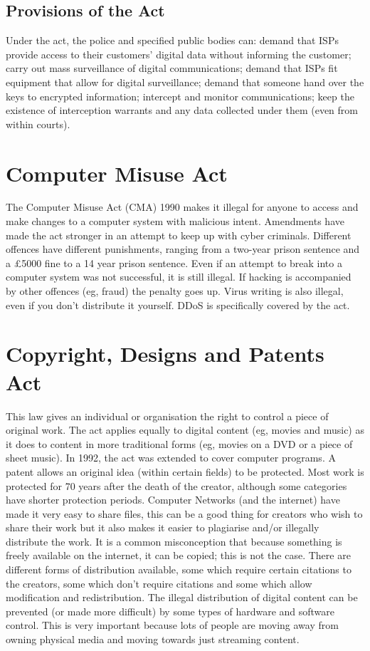 \documentclass[a4paper,11pt, twocolumn]{article}
\begin{document}
\subsection{Provisions of the Act}
Under the act, the police and specified public bodies can: demand that ISPs provide access to their customers' digital data without informing the customer; carry out mass surveillance of digital communications; demand that ISPs fit equipment that allow for digital surveillance; demand that someone hand over the keys to encrypted information; intercept and monitor communications; keep the existence of interception warrants and any data collected under them  (even from within courts).
\section{Computer Misuse Act}
The Computer Misuse Act (CMA) 1990 makes it illegal for anyone to access and make changes to a computer system with malicious intent.
Amendments have made the act stronger in an attempt to keep up with cyber criminals. 
Different offences have different punishments, ranging from a two-year prison sentence and a £5000 fine to a 14 year prison sentence.
Even if an attempt to break into a computer system was not successful, it is still illegal. If hacking is accompanied by other offences (eg, fraud) the penalty goes up.
Virus writing is also illegal, even if you don't distribute it yourself. DDoS is specifically covered by the act.
\section{Copyright, Designs and Patents Act}
This law gives an individual or organisation the right to control a piece of original work. The act applies equally to digital content (eg, movies and music) as it does to content in more traditional forms (eg, movies on a DVD or a piece of sheet music).
In 1992, the act was extended to cover computer programs. A patent allows an original idea (within certain fields) to be protected.
Most work is protected for 70 years after the death of the creator, although some categories have shorter protection periods.
Computer Networks (and the internet) have made it very easy to share files, this can be a good thing for creators who wish to share their work but it also makes it easier to plagiarise and/or illegally distribute the work. It is a common misconception that because something is freely available on the internet, it can be copied; this is not the case. There are different forms of distribution available, some which require certain citations to the creators, some which don't require citations and some which allow modification and redistribution. The illegal distribution of digital content can be prevented (or made more difficult) by some types of hardware and software control. This is very important because lots of people are moving away from owning physical media and moving towards just streaming content. 
\end{document}
